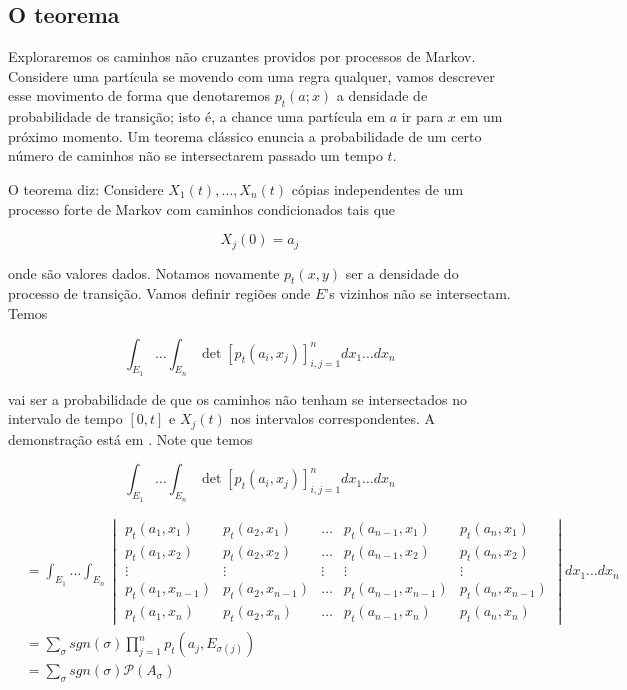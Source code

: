 \subsection{O teorema}

Exploraremos os caminhos não cruzantes providos por processos de Markov. Considere uma partícula se movendo com uma regra qualquer, vamos descrever esse movimento de forma que denotaremos $p_t(a;x)$ a densidade de probabilidade de transição; isto é, a chance uma partícula em $a$ ir para $x$ em um próximo momento. Um teorema clássico enuncia a probabilidade de um certo número de caminhos não se intersectarem passado um tempo $t$.

O teorema diz: Considere $X_1(t), \dots, X_n(t)$ cópias independentes de um processo forte de Markov com caminhos condicionados tais que

\[
	X_j(0) = a_j
\] 

onde  são valores dados. Notamos novamente $p_t(x, y)$ ser a densidade do processo de transição. Vamos definir regiões  onde $E$'s vizinhos não se intersectam. Temos

\[
	\int_{E_1} \dots \int_{E_n} \det{[p_t(a_i, x_j)]^{n}_{i,j=1}} dx_1 \dots dx_n
\]

vai ser a probabilidade de que os caminhos não tenham se intersectados no intervalo de tempo $[0, t]$ e $X_j(t)$ nos intervalos correspondentes. A demonstração está em \cite{ArnoLectureNotes}. Note que temos

\[
\int_{E_1} \dots \int_{E_n} \det{[p_t(a_i, x_j)]^{n}_{i,j=1}}  dx_1 \dots dx_n
\]

\begin{align}
	& = \int_{E_1} \dots \int_{E_n}
	\begin{vmatrix}
		p_t(a_1, x_1) 	& p_t(a_2, x_1) 	 & \dots	& p_t(a_{n-1}, x_1) 	& p_t(a_n, x_1) \\
		p_t(a_1, x_2) 	& p_t(a_2, x_2) 	 & \dots 	&  p_t(a_{n-1}, x_2)				&  p_t(a_n, x_2) \\
		\vdots 			& \vdots 			 & \vdots 	& \vdots 				& \vdots \\
		p_t(a_1, x_{n-1}) & p_t(a_2, x_{n-1})& \dots 	&  	p_t(a_{n-1}, x_{n-1})	& p_t(a_n, x_{n-1}) \\
		p_t(a_1, x_n) 	& p_t(a_2, x_n) 	 & \dots  	& p_t(a_{n-1}, x_n) 	& p_t(a_n, x_n)
	\end{vmatrix} dx_1 \dots dx_n \\ 
	& = \sum_{\sigma}sgn(\sigma) \prod_{j=1}^{n} p_t(a_j, E_{\sigma(j)}) \\
	& = \sum_{\sigma} sgn(\sigma) \mathcal{P}(A_\sigma)
	\label{eq: detInd}
\end{align}

